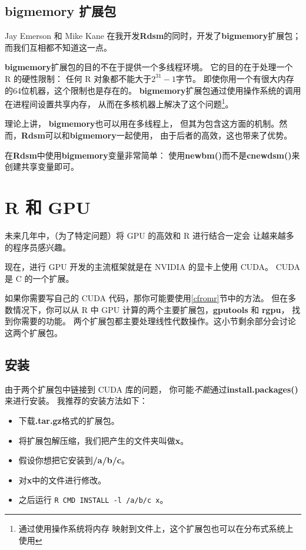 \subsection{bigmemory 扩展包}
\label{bigmemory}

Jay Emerson 和 Mike Kane 在我开发{\bf Rdsm}的同时，开发了{\bf bigmemory}扩展包；
而我们互相都不知道这一点。

{\bf bigmemory}扩展包的目的不在于提供一个多线程环境。
它的目的在于处理一个 R 的硬性限制：
任何 R 对象都不能大于$2^{31}-1$字节。
即使你用一个有很大内存的64位机器，这个限制也是存在的。
{\bf bigmemory}扩展包通过使用操作系统的调用在进程间设置共享内存，
从而在多核机器上解决了这个问题\footnote{通过使用操作系统将内存
映射到文件上，这个扩展包也可以在分布式系统上使用}。

理论上讲， {\bf bigmemory}也可以用在多线程上，
但其为包含这方面的机制。然而，{\bf Rdsm}可以和{\bf bigmemory}一起使用，
由于后者的高效，这也带来了优势。

在{\bf Rdsm}中使用{\bf bigmemory}变量非常简单：
使用{\bf newbm()}而不是{\bf cnewdsm()}来创建共享变量即可。

\section{R 和 GPU}

未来几年中，（为了特定问题）将 GPU 的高效和 R 进行结合一定会
让越来越多的程序员感兴趣。

现在，进行 GPU 开发的主流框架就是在 NVIDIA 的显卡上使用 CUDA。
CUDA 是 C 的一个扩展。

如果你需要写自己的 CUDA 代码，那你可能要使用\ref{cfromr}节中的方法。
但在多数情况下，你可以从 R 中 GPU 计算的两个主要扩展包，{\bf gputools} 和 {\bf rgpu}，
找到你需要的功能。
两个扩展包都主要处理线性代数操作。这小节剩余部分会讨论
这两个扩展包。

\subsection{安装}
\label{gpuinstall}

由于两个扩展包中链接到 CUDA 库的问题，
你可能{\it 不能}通过{\bf install.packages()}来进行安装。
我推荐的安装方法如下：

\begin{itemize}

\item 下载{\bf .tar.gz}格式的扩展包。

\item 将扩展包解压缩，我们把产生的文件夹叫做{\bf x}。

\item 假设你想把它安装到{\bf /a/b/c}。

\item 对{\bf x}中的文件进行修改。

\item 之后运行 \texttt{R CMD INSTALL -l /a/b/c x}。

\end{itemize}

